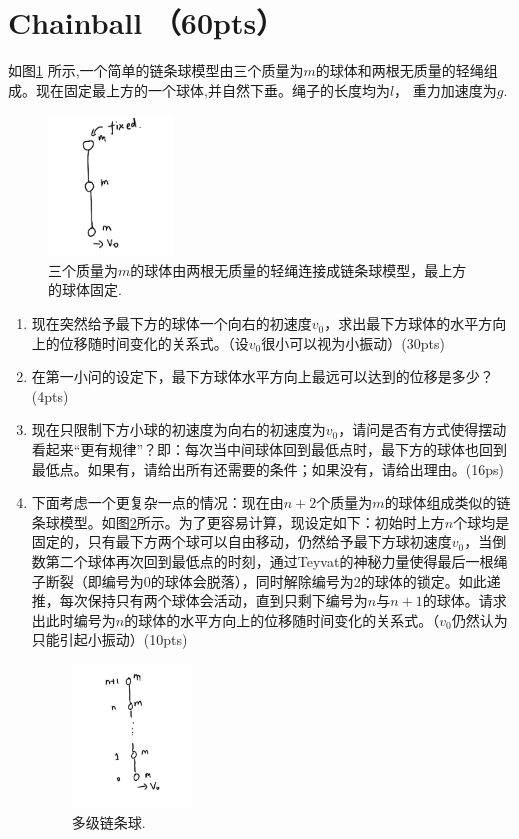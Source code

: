 \section{Chainball （60pts）}
如图\ref{fig:chainball} 所示,一个简单的链条球模型由三个质量为$m$的球体和两根无质量的轻绳组成。现在固定最上方的一个球体,并自然下垂。绳子的长度均为\(l\)， 重力加速度为\(g\).

\begin{figure}
	\centering
	\includegraphics[width=0.3\textwidth]{chainball}
	\caption{三个质量为$m$的球体由两根无质量的轻绳连接成链条球模型，最上方的球体固定.}
	\label{fig:chainball}
\end{figure}

\begin{enumerate}
	\item 现在突然给予最下方的球体一个向右的初速度$v_0$，求出最下方球体的水平方向上的位移随时间变化的关系式。（设\(v_{0}\)很小可以视为小振动）(30pts)
	\item 在第一小问的设定下，最下方球体水平方向上最远可以达到的位移是多少？(4pts)
	\item 现在只限制下方小球的初速度为向右的初速度为\(v_0\)，请问是否有方式使得摆动看起来“更有规律”？即：每次当中间球体回到最低点时，最下方的球体也回到最低点。如果有，请给出所有还需要的条件；如果没有，请给出理由。(16ps)
	\item 下面考虑一个更复杂一点的情况：现在由\(n+2\)个质量为\(m\)的球体组成类似的链条球模型。如图\ref{fig:chainball2}所示。为了更容易计算，现设定如下：初始时上方\(n\)个球均是固定的，只有最下方两个球可以自由移动，仍然给予最下方球初速度\(v_{0}\)，当倒数第二个球体再次回到最低点的时刻，通过Teyvat的神秘力量使得最后一根绳子断裂（即编号为0的球体会脱落），同时解除编号为2的球体的锁定。如此递推，每次保持只有两个球体会活动，直到只剩下编号为\(n\)与\(n+1\)的球体。请求出此时编号为\(n\)的球体的水平方向上的位移随时间变化的关系式。（\(v_{0}\)仍然认为只能引起小振动）(10pts)
	\begin{figure}[htbp]
	\centering
	\includegraphics[width=0.3\textwidth]{chainball2}
	\caption{多级链条球.}
	\label{fig:chainball2}
 \end{figure}
\end{enumerate}